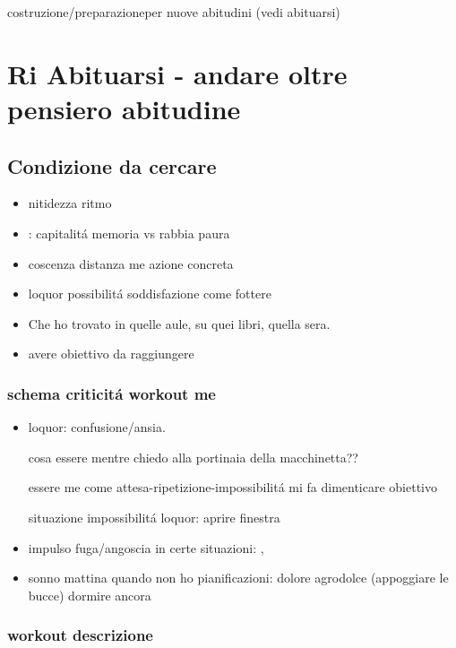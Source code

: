 costruzione/preparazioneper nuove abitudini (vedi abituarsi)

{\let\clearpage\relax
\chapter{Ri Abituarsi - andare oltre pensiero abitudine}
}
\listofkeywords

\section{Condizione da cercare}

\begin{itemize}
\item nitidezza ritmo
\item {}: capitalit\'a memoria vs rabbia paura
\item coscenza distanza me azione concreta
\item loquor possibilit\'a soddisfazione come fottere
\item Che ho trovato in quelle aule, su quei libri, quella sera.
\item avere obiettivo da raggiungere
\end{itemize}

\subsection{schema criticit\'a workout me}

\begin{itemize}
\item loquor: confusione/ansia.

cosa essere mentre chiedo alla portinaia della macchinetta??

essere me come attesa-ripetizione-impossibilit\'a mi fa dimenticare obiettivo

situazione impossibilit\'a loquor: aprire finestra

\item impulso fuga/angoscia in certe situazioni: , 
\item sonno mattina quando non ho pianificazioni: dolore agrodolce (appoggiare le bucce) dormire ancora
\end{itemize} 


\subsection{workout descrizione}\label{ssec:wdesc}

